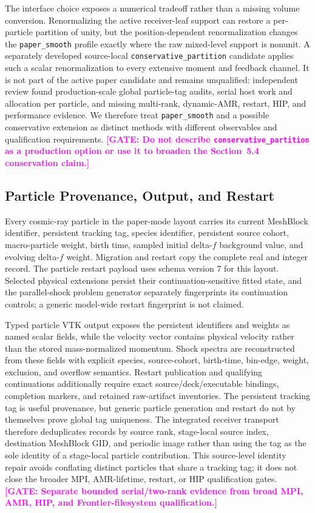 \documentclass[twocolumn]{aastex701}
\newcommand{\GATE}[1]{\textcolor{magenta}{\textbf{[GATE: #1]}}}
\begin{document}
The interface choice exposes a numerical tradeoff rather than a missing volume
conversion. Renormalizing the active receiver-leaf support can restore a
per-particle partition of unity, but the position-dependent renormalization
changes the \texttt{paper\_smooth} profile exactly where the raw mixed-level
support is nonunit. A separately developed source-local
\texttt{conservative\_partition} candidate applies such a scalar
renormalization to every extensive moment and feedback channel. It is not part
of the active paper candidate and remains unqualified: independent review
found production-scale global particle-tag audits, serial host work and
allocation per particle, and missing multi-rank, dynamic-AMR, restart, HIP,
and performance evidence. We therefore treat \texttt{paper\_smooth} and a
possible conservative extension as distinct methods with different
observables and qualification requirements.
\GATE{Do not describe \texttt{conservative\_partition} as a production option
or use it to broaden the Section~5.4 conservation claim.}

\subsection{Particle Provenance, Output, and Restart}

Every cosmic-ray particle in the paper-mode layout carries its current
MeshBlock identifier, persistent tracking
tag, species identifier, persistent source cohort, macro-particle weight,
birth time, sampled initial delta-$f$ background value, and evolving delta-$f$
weight. Migration and restart copy the complete real and integer record. The
particle restart payload uses schema version 7 for this layout. Selected
physical extensions persist their continuation-sensitive fitted state, and the
parallel-shock problem generator separately fingerprints its continuation
controls; a generic model-wide restart fingerprint is not claimed.

Typed particle VTK output exposes the persistent identifiers and weights as
named scalar fields, while the velocity vector contains physical velocity
rather than the stored mass-normalized momentum. Shock spectra are reconstructed
from these fields with explicit species, source-cohort, birth-time, bin-edge,
weight, exclusion, and overflow semantics. Restart publication and qualifying
continuations additionally require exact source/deck/executable bindings,
completion markers, and retained raw-artifact inventories.
The persistent tracking tag is useful provenance, but generic particle
generation and restart do not by themselves prove global tag uniqueness. The
integrated receiver transport therefore deduplicates records by source rank,
stage-local source index, destination MeshBlock GID, and periodic image rather
than using the tag as the sole identity of a stage-local particle contribution.
This source-level identity repair avoids conflating distinct particles that
share a tracking tag; it does not close the broader MPI, AMR-lifetime, restart,
or HIP qualification gates.
\GATE{Separate bounded serial/two-rank evidence from broad MPI, AMR, HIP, and
Frontier-filesystem qualification.}
\end{document}
